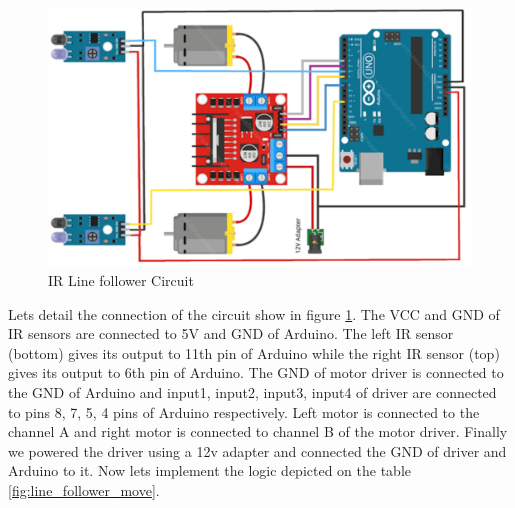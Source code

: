 \begin{figure}
    \centering
    \includegraphics{Images/IR Sensor/ir_bot.png}
     \caption{\ac{IR} Line follower Circuit}
     \label{fig:ir_bot}
\end{figure}

\par Lets detail the connection of the circuit show in figure \ref{fig:ir_bot}. The VCC and GND of \ac{IR} sensors are connected to 5V and GND of Arduino. The left \ac{IR} sensor (bottom) gives its output to 11th pin of Arduino while the right \ac{IR} sensor (top) gives its output to 6th pin of Arduino. The GND of motor driver is connected to the GND of Arduino and input1, input2, input3, input4 of driver are connected to pins 8, 7, 5, 4 pins of Arduino respectively. Left motor is connected to the channel A and right motor is connected to channel B of the motor driver. Finally we powered the driver using a 12v adapter and connected the GND of driver and Arduino to it. Now lets implement the logic depicted on the table \ref{fig:line_follower_move}.

